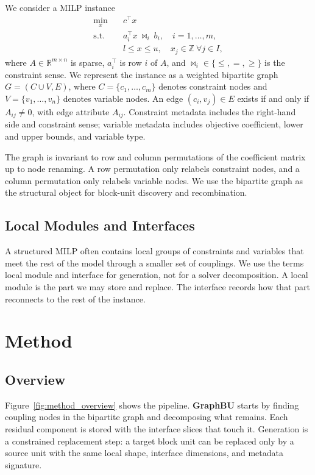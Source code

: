 \documentclass[letterpaper]{article}
\newcommand{\method}{\textbf{GraphBU}\xspace}
\begin{document}
We consider a MILP instance
\begin{equation}
\begin{aligned}
\min_x \quad & c^\top x\\
\mathrm{s.t.}\quad
& a_i^\top x \ \bowtie_i\ b_i,\quad i=1,\ldots,m,\\
& l \le x \le u,\quad x_j \in \mathbb{Z}\ \forall j\in I,
\end{aligned}
\label{eq:milp}
\end{equation}
where $A\in \mathbb{R}^{m\times n}$ is sparse, $a_i^\top$ is row $i$ of $A$, and $\bowtie_i\in\{\le,=,\ge\}$ is the constraint sense. We represent the instance as a weighted bipartite graph $G=(C\cup V,E)$, where $C=\{c_1,\ldots,c_m\}$ denotes constraint nodes and $V=\{v_1,\ldots,v_n\}$ denotes variable nodes. An edge $(c_i,v_j)\in E$ exists if and only if $A_{ij}\ne 0$, with edge attribute $A_{ij}$. Constraint metadata includes the right-hand side and constraint sense; variable metadata includes objective coefficient, lower and upper bounds, and variable type.

The graph is invariant to row and column permutations of the coefficient matrix up to node renaming. A row permutation only relabels constraint nodes, and a column permutation only relabels variable nodes. We use the bipartite graph as the structural object for block-unit discovery and recombination.

\subsection{Local Modules and Interfaces}

A structured MILP often contains local groups of constraints and variables that meet the rest of the model through a smaller set of couplings. We use the terms local module and interface for generation, not for a solver decomposition. A local module is the part we may store and replace. The interface records how that part reconnects to the rest of the instance.

\section{Method}

\subsection{Overview}

Figure~\ref{fig:method_overview} shows the pipeline. \method starts by finding coupling nodes in the bipartite graph and decomposing what remains. Each residual component is stored with the interface slices that touch it. Generation is a constrained replacement step: a target block unit can be replaced only by a source unit with the same local shape, interface dimensions, and metadata signature.
\end{document}
